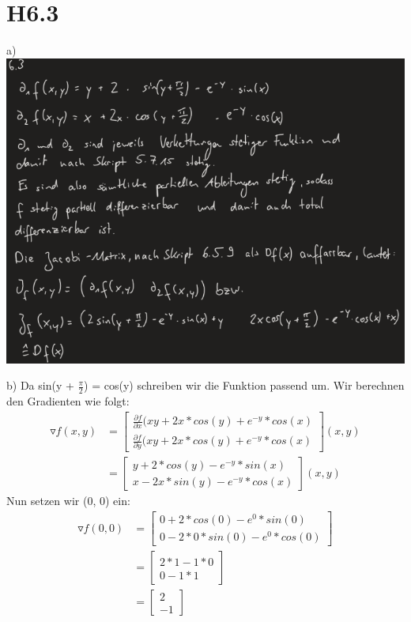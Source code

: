 \documentclass{article}
\begin{document}
\section{H6.3}
\noindent a) \\ 
\includegraphics[scale=0.6]{ h3_1 }

\bigskip
\noindent b) 
Da sin(y  + $\frac{\pi}{2}$) = cos(y) schreiben wir die Funktion passend um.
Wir berechnen den Gradienten wie folgt:
\begin{align*}
    \triangledown f(x, y) &= \begin{bmatrix}
        \frac{\partial f}{\partial x} (xy + 2x * cos(y) + e^{-y} * cos(x) \\        
        \frac{\partial f}{\partial y} (xy + 2x * cos(y) + e^{-y} * cos(x)
                            \end{bmatrix}
                            (x, y) \\ 
                          &= \begin{bmatrix}
                              y + 2 * cos(y) - e^{-y} * sin(x) \\ 
                              x - 2x * sin(y) - e^{-y} * cos(x)
                          \end{bmatrix} 
                          (x, y) 
\end{align*}
Nun setzen wir (0, 0) ein:
\begin{align*}
    \triangledown f(0, 0) &= \begin{bmatrix}
       0 + 2 * cos(0) - e^0 * sin(0) \\ 
       0 - 2 * 0 * sin(0) - e^0 * cos(0)
    \end{bmatrix} \\ 
                          &= \begin{bmatrix}
                           2 * 1 - 1 * 0 \\ 
                           0 - 1 * 1
                          \end{bmatrix} \\ 
                          &= \begin{bmatrix}
                           2 \\ 
                           -1
                          \end{bmatrix}
\end{align*}
\end{document}
